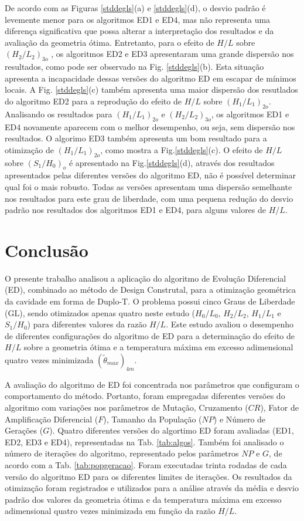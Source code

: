 \documentclass[12pt,A4,A4pt]{article}
\begin{document}
 De acordo com as Figuras \ref{stddegls}(a) e \ref{stddegls}(d), o desvio padrão é levemente menor para os algoritmos ED1 e ED4, mas não representa uma diferença significativa que possa alterar a interpretação dos resultados e da avaliação da geometria ótima. Entretanto, para o efeito de $H/L$ sobre ${(H_{2}/L_{2})_{3o}}$	, os algoritmos ED2 e ED3 apresentaram uma grande dispersão nos resultados, como pode ser observado na Fig. \ref{stddegls}(b). Esta situação apresenta a incapacidade dessas versões do algoritmo ED em escapar de mínimos locais.  A Fig. \ref{stddegls}(c) também apresenta uma maior dispersão dos resutlados do algoritmo ED2 para a reprodução do efeito de $H/L$ sobre ${(H_{1}/L_{1})_{2o}}$. Analisando os resultados para  ${(H_{1}/L_{1})_{2o}}$ e ${(H_{2}/L_{2})_{3o}}$, os algoritmos ED1 e ED4 novamente aparecem com o melhor desempenho, ou seja, sem dispersão nos resultados. O algorimo ED3 também apresenta um bom resultado para a otimização de ${(H_{1}/L_{1})_{2o}}$, como mostra a Fig.\ref{stddegls}(c). O efeito de $H/L$ sobre ${(S_{1}/H_{0})_{o}}$ é apresentado na Fig.\ref{stddegls}(d), através dos resultados apresentados pelas diferentes versões do algoritmo ED, não é possível determinar qual foi o mais robusto. Todas as versões apresentam uma dispersão semelhante nos resultados para este grau de liberdade, com uma pequena redução do desvio padrão nos resultados dos algoritmos ED1 e ED4, para alguns valores de $H/L$.


\section{Conclusão}
\label{opt}
\hspace{0.5cm} O presente trabalho analisou a aplicação do algoritmo de Evolução Diferencial (ED), combinado ao método de Design Construtal, para a otimização geométrica da cavidade em forma de Duplo-T. O problema possui cinco Graus de Liberdade (GL), sendo otimizados apenas quatro neste estudo ($H_{0}/L_{0}$,  $H_{2}/L_{2}$, $H_{1}/L_{1}$ e $S_{1}/H_{0}$) para diferentes valores da razão $H/L$. Este estudo avaliou o desempenho de diferentes configurações do algoritmo de ED para a determinação do efeito de $H/L$ sobre a geometria ótima e a temperatura máxima em excesso adimensional quatro vezes minimizada  $({\tilde{\theta}}_{max})_{4m}$.

A avaliação do algoritmo de ED foi concentrada nos parâmetros que configuram o comportamento do método. Portanto, foram empregadas diferentes versões do algoritmo com variações nos parâmetros de Mutação, Cruzamento ($CR$), Fator de Amplificação Diferencial ($F$), Tamanho da População ($NP$) e Número de Gerações ($G$). Quatro diferentes versões do algortimo ED foram avaliadas (ED1, ED2, ED3 e ED4), representadas na Tab. \ref{tab:algos}. Também foi analisado o número de iterações do algoritmo, representado pelos parâmetros $NP$ e $G$, de acordo com a Tab. \ref{tab:popgeracao}. Foram executadas trinta rodadas de cada versão do algoritmo ED para os diferentes limites de iterações. Os resultados da otimização foram registrados e utilizados para a análise através da média e desvio padrão dos valores da geometria ótima e da temperatura máxima em excesso adimensional quatro vezes minimizada em função da razão $H/L$.
\end{document}
